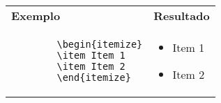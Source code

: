 \begin{quadro}[!htb]
    \centering
    \begin{tabular}{p{7.5cm}|p{7.5cm}}
        \textbf{Exemplo} & \textbf{Resultado} \\
        
        \begin{verbatim}
        \begin{itemize}
        \item Item 1
        \item Item 2
        \end{itemize}
        \end{verbatim} 
        & 
        \begin{itemize}
        \item Item 1
        \item Item 2
        \end{itemize}
        \\
        
    \end{tabular}
\end{quadro}